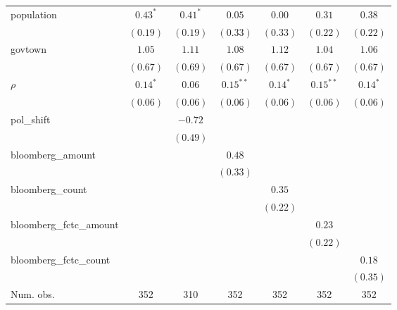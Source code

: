 \begin{table}[!h]
\begin{center}
\begin{tabular}{l c c c c c c }
population              & $0.43^{*}$   & $0.41^{*}$   & $0.05$       & $0.00$       & $0.31$       & $0.38$       \\
                        & $(0.19)$     & $(0.19)$     & $(0.33)$     & $(0.33)$     & $(0.22)$     & $(0.22)$     \\
govtown                 & $1.05$       & $1.11$       & $1.08$       & $1.12$       & $1.04$       & $1.06$       \\
                        & $(0.67)$     & $(0.69)$     & $(0.67)$     & $(0.67)$     & $(0.67)$     & $(0.67)$     \\
$\rho$                  & $0.14^{*}$   & $0.06$       & $0.15^{**}$  & $0.14^{*}$   & $0.15^{**}$  & $0.14^{*}$   \\
                        & $(0.06)$     & $(0.06)$     & $(0.06)$     & $(0.06)$     & $(0.06)$     & $(0.06)$     \\
pol\_shift              &              & $-0.72$      &              &              &              &              \\
                        &              & $(0.49)$     &              &              &              &              \\
bloomberg\_amount       &              &              & $0.48$       &              &              &              \\
                        &              &              & $(0.33)$     &              &              &              \\
bloomberg\_count        &              &              &              & $0.35$       &              &              \\
                        &              &              &              & $(0.22)$     &              &              \\
bloomberg\_fctc\_amount &              &              &              &              & $0.23$       &              \\
                        &              &              &              &              & $(0.22)$     &              \\
bloomberg\_fctc\_count  &              &              &              &              &              & $0.18$       \\
                        &              &              &              &              &              & $(0.35)$     \\
\midrule
Num. obs.               & 352          & 310          & 352          & 352          & 352          & 352          \\

\end{tabular}
\end{center}
\end{table}
